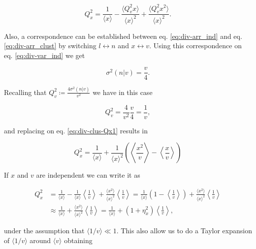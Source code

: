 \begin{equation}
  \label{eq:div-clus-Qx1}
  Q_x^2 = \frac{1}{\langle x\rangle} - \frac{\langle Q_v^2x\rangle}{\langle x\rangle^2} + \frac{\langle Q_v^2x^2\rangle}{\langle x\rangle^2}.
\end{equation}

Also, a correspondence can be established between eq. \eqref{eq:div-arr_ind} and eq. \eqref{eq:div-arr_clust} by switching $l\leftrightarrow n$ and $x\leftrightarrow v$. Using this correspondence on eq. \eqref{eq:div-var_ind} we get 

\begin{equation}
  \sigma^2(n|v) = \frac{v}{4}.
\end{equation}

Recalling that $Q_v^2 \coloneqq \frac{4\sigma^2(n|v)}{v^2}$ we have in this case

\begin{equation}
  Q_v^2 = \frac{4}{v^2}\frac{v}{4} = \frac{1}{v},
\end{equation}

and replacing on eq. \eqref{eq:div-clus-Qx1} results in

\begin{equation}
  \label{eq:div-clus-Qx2}
  \boxed{Q_x^2 = \frac{1}{\langle x\rangle} + \frac{1}{\langle x\rangle^2}\left(\left\langle \frac{x^2}{v}\right\rangle-\left\langle \frac{x}{v}\right\rangle \right)}
\end{equation}

If $x$ and $v$ are independent we can write it as

\begin{equation*}
  \begin{split}
    Q_x^2 &= \frac{1}{\langle x\rangle} - \frac{1}{\langle x\rangle}\left\langle\frac{1}{v}\right\rangle + \frac{\langle x^2\rangle}{\langle x\rangle^2}\left\langle\frac{1}{v}\right\rangle = \frac{1}{\langle x\rangle}\left(1-\left\langle\frac{1}{v}\right\rangle\right)+\frac{\langle x^2\rangle}{\langle x\rangle^2}\left\langle\frac{1}{v}\right\rangle\\
  &\approx \frac{1}{\langle x\rangle} + \frac{\langle x^2\rangle}{\langle x\rangle^2}\left\langle\frac{1}{v}\right\rangle = \frac{1}{\langle x\rangle} + \left(1+\eta_x^2\right)\left\langle\frac{1}{v}\right\rangle,
  \end{split}
\end{equation*}

under the assumption that $\langle 1/v\rangle \ll 1$. This also allow us to do a Taylor expansion of $\langle 1/v\rangle$ around $\langle v\rangle$ obtaining

